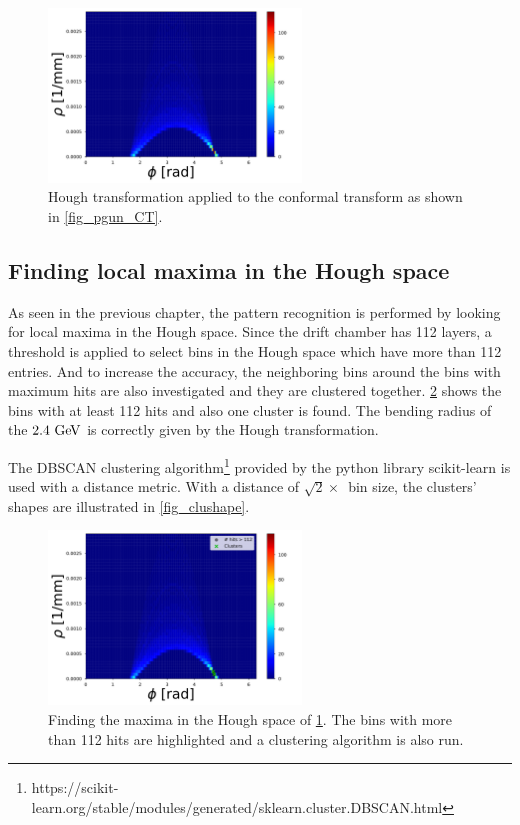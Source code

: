 \begin{figure}[ht]
	\centering
	\includegraphics[width=0.6\textwidth]{figures/HT_pgun.pdf}%
	\caption{Hough transformation applied to the conformal transform as shown in \cref{fig_pgun_CT}.}
	\label{fig_pgun_HT}
\end{figure}

\subsection{Finding local maxima in the Hough space}
As seen in the previous chapter, the pattern recognition is performed by looking for local maxima in the Hough space. Since the drift chamber has 112 layers, a threshold is applied to select bins in the Hough space which have more than 112 entries. And to increase the accuracy, the neighboring bins around the bins with maximum hits are also investigated and they are clustered together. \cref{fig_pgun_HT_maxima} shows the bins with at least 112 hits and also one cluster is found. The bending radius of the $2.4\,\mathrm{\,Ge\kern -0.1em V}$ is correctly given by the Hough transformation.

The DBSCAN clustering algorithm\footnote{https://scikit-learn.org/stable/modules/generated/sklearn.cluster.DBSCAN.html} provided by the python library scikit-learn is used with a distance metric. With a distance of $\sqrt{2} \times$~bin size, the clusters' shapes are illustrated in \cref{fig_clushape}.

\begin{figure}[ht]
	\centering
	\includegraphics[width=0.6\textwidth]{figures/HT_pgun_maxima.pdf}%
	\caption{Finding the maxima in the Hough space of \cref{fig_pgun_HT}. The bins with more than 112 hits are highlighted and a clustering algorithm is also run.}
	\label{fig_pgun_HT_maxima}
\end{figure}




